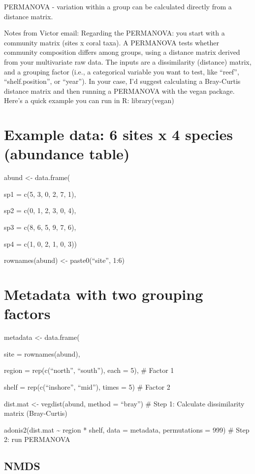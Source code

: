 \documentclass[
]{article}
\begin{document}
PERMANOVA - variation within a group can be calculated directly from a
distance matrix.

Notes from Victor email: Regarding the PERMANOVA: you start with a
community matrix (sites x coral taxa). A PERMANOVA tests whether
community composition differs among groups, using a distance matrix
derived from your multivariate raw data. The inputs are a dissimilarity
(distance) matrix, and a grouping factor (i.e., a categorical variable
you want to test, like ``reef'', ``shelf.position'', or ``year''). In
your case, I'd suggest calculating a Bray-Curtis distance matrix and
then running a PERMANOVA with the vegan package. Here's a quick example
you can run in R: library(vegan)

\section{Example data: 6 sites x 4 species (abundance
table)}\label{example-data-6-sites-x-4-species-abundance-table}

abund \textless- data.frame(

sp1 = c(5, 3, 0, 2, 7, 1),

sp2 = c(0, 1, 2, 3, 0, 4),

sp3 = c(8, 6, 5, 9, 7, 6),

sp4 = c(1, 0, 2, 1, 0, 3))

rownames(abund) \textless- paste0(``site'', 1:6)

\section{Metadata with two grouping
factors}\label{metadata-with-two-grouping-factors}

metadata \textless- data.frame(

site = rownames(abund),

region = rep(c(``north'', ``south''), each = 5), \# Factor 1

shelf = rep(c(``inshore'', ``mid''), times = 5) \# Factor 2

dist.mat \textless- vegdist(abund, method = ``bray'') \# Step 1:
Calculate dissimilarity matrix (Bray-Curtis)

adonis2(dist.mat \textasciitilde{} region * shelf, data = metadata,
permutations = 999) \# Step 2: run PERMANOVA

\subsection{NMDS}\label{nmds}
\end{document}
